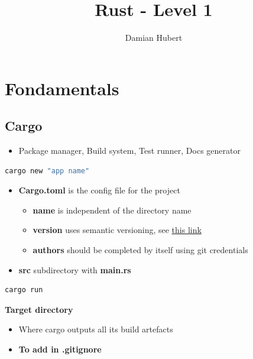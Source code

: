 \documentclass{report}
\author{Damian Hubert}
\title{Rust - Level 1}
\begin{document}
\maketitle
\tableofcontents


\chapter{Fondamentals}

\begin{multicols*}{2}


\section{Cargo}
\begin{itemize}
	\item Package manager, Build system, Test runner, Docs generator
\end{itemize}

\begin{tcolorbox}[title=Creating Project,colback=backcolour,size=small,left=4mm]
\begin{lstlisting}[language=bash]
cargo new "app name"
\end{lstlisting}
\end{tcolorbox}

\begin{itemize}
	\item \textbf{Cargo.toml} is the config file for the project
		\begin{itemize}
			\item \textbf{name} is independent of the directory name 
			\item \textbf{version} uses semantic versioning, see \href{https://semver.org}{this link} 
			\item \textbf{authors} should be completed by itself using git credentials 
		\end{itemize}
	\item \textbf{src} subdirectory with \textbf{main.rs} 
\end{itemize}

\begin{tcolorbox}[title=Running a Program,colback=backcolour,size=small,left=4mm]
\begin{lstlisting}[language=bash]
cargo run
\end{lstlisting}
\end{tcolorbox}

\textbf{Target directory}
\begin{itemize}
	\item Where cargo outputs all its build artefacts 
	\item \textbf{To add in .gitignore} 
\end{itemize}


\end{multicols*}
\end{document}
